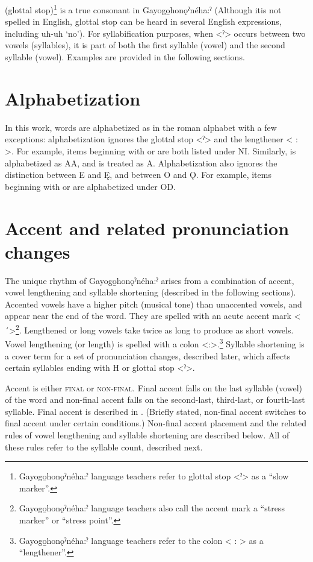 \begin{description}[font=\normalfont]
\item[<ˀ>] (glottal stop)\footnote{Gayogo̱honǫˀnéha:ˀ language teachers refer to glottal stop <ˀ> as a “slow marker”.} is a true consonant in Gayogo̱honǫˀnéha:ˀ (Although itis not spelled in English, glottal stop can be heard in several English expressions, including  uh-uh  ‘no’). For syllabification purposes, when <ˀ> occurs between two vowels (syllables), it is part of both the first syllable (vowel) and the second syllable (vowel). Examples are provided in the following sections.
\end{description}


\section{Alphabetization}

In this work, words are alphabetized as in the roman alphabet with a few exceptions: alphabetization ignores the glottal stop <ˀ> and the lengthener < : >. For example, items beginning with  or  are both listed under NI. Similarly,  is alphabetized as AA, and  is treated as A. Alphabetization also ignores the distinction between E and Ę, and between O and Ǫ. For example, items beginning with  or  are alphabetized under OD.


\section{Accent and related pronunciation changes}
The unique rhythm of Gayogo̱honǫˀnéha:ˀ arises from a combination of accent, vowel lengthening and syllable shortening (described in the following sections). Accented vowels have a higher pitch (musical tone) than unaccented vowels, and appear near the end of the word. They are spelled with an acute accent mark <´>\footnote{Gayogo̱honǫˀnéha:ˀ language teachers also call the accent mark a “stress marker” or “stress point”.}. Lengthened or long vowels take twice as long to produce as short vowels. Vowel lengthening (or length) is spelled with a colon <:>.\footnote{Gayogo̱honǫˀnéha:ˀ language teachers refer to the colon < : > as a “lengthener”.} Syllable shortening is a cover term for a set of pronunciation changes, described later, which affects certain syllables ending with H or glottal stop <ˀ>. 

Accent is either \textsc{final} or \textsc{non-final}. Final accent falls on the last syllable (vowel) of the word and non-final accent falls on the second-last, third-last, or fourth-last syllable. Final accent is described in . (Briefly stated, non-final accent switches to final accent under certain conditions.) Non-final accent placement and the related rules of vowel lengthening and syllable shortening are described below. All of these rules refer to the syllable count, described next.

